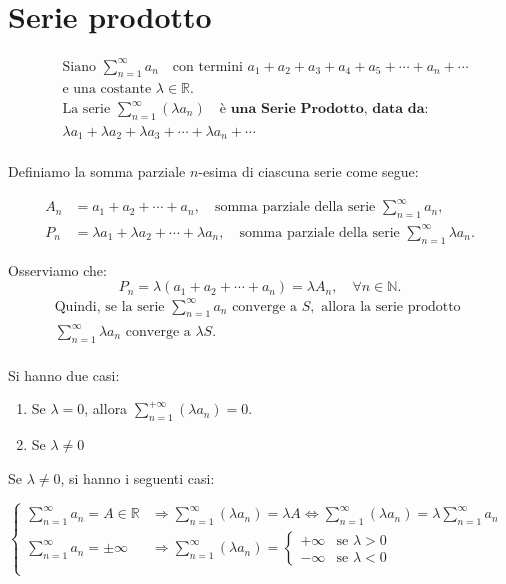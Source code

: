 \documentclass{article}
\begin{document}
   \section*{Serie prodotto}

\begin{align*}
    &\text{Siano } \sum_{n=1}^{\infty} a_n \quad \text{con termini } a_1 + a_2 + a_3 + a_4 + a_5 + \cdots + a_n + \cdots \\
    &\text{e una costante } \lambda \in \mathbb{R}. \\
    &\text{La serie } \sum_{n=1}^{\infty} \left(\lambda a_n\right) \quad \textbf{è una Serie Prodotto, data da:} \\
    &\lambda a_1 + \lambda a_2 + \lambda a_3 + \cdots + \lambda a_n + \cdots \\
\end{align*}

Definiamo la somma parziale \( n \)-esima di ciascuna serie come segue:

\begin{align*}
    A_n &= a_1 + a_2 + \cdots + a_n, \quad \text{somma parziale della serie } \sum_{n=1}^{\infty} a_n, \\
    P_n &= \lambda a_1 + \lambda a_2 + \cdots + \lambda a_n, \quad \text{somma parziale della serie } \sum_{n=1}^{\infty} \lambda a_n.
\end{align*}

Osserviamo che:
\[
    P_n = \lambda \left(a_1 + a_2 + \cdots + a_n\right) = \lambda A_n, \quad \forall n \in \mathbb{N}.
\]
\begin{align*}
    \text{Quindi, se la serie } \sum_{n=1}^{\infty} a_n \text{ converge a } S, \text{ allora la serie prodotto } \\ \sum_{n=1}^{\infty} \lambda a_n \text{ converge a } \lambda S. \\
\end{align*}

Si hanno due casi:
\begin{enumerate}
    \item Se $\lambda = 0$, allora $\sum_{n=1}^{+\infty} \left( \lambda a_n \right) = 0$.
    \item Se $\lambda \neq 0$
\end{enumerate}

Se $\lambda \neq 0$, si hanno i seguenti casi:

$
\begin{cases}
    \sum_{n=1}^{\infty} a_n = A \in \mathbb{R} & \Rightarrow \sum_{n=1}^{\infty} \left( \lambda a_n \right) = \lambda A \Leftrightarrow \sum_{n=1}^{\infty} \left( \lambda a_n \right) = \lambda \sum_{n=1}^{\infty} a_n \\
    \sum_{n=1}^{\infty} a_n = \pm\infty & \Rightarrow \sum_{n=1}^{\infty} \left( \lambda a_n \right) = 
    \begin{cases}
        +\infty & \text{se } \lambda > 0 \\
        -\infty & \text{se } \lambda < 0
    \end{cases} 
    \\
\end{cases} $
\end{document}
